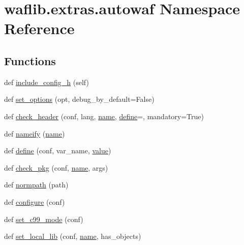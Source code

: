 \hypertarget{namespacewaflib_1_1extras_1_1autowaf}{}\section{waflib.\+extras.\+autowaf Namespace Reference}
\label{namespacewaflib_1_1extras_1_1autowaf}
\subsection*{Functions}
\begin{DoxyCompactItemize}
\item 
def \hyperlink{namespacewaflib_1_1extras_1_1autowaf_accf5c76eadfa640cc8663773bfa12ed0}{include\+\_\+config\+\_\+h} (self)
\item 
def \hyperlink{namespacewaflib_1_1extras_1_1autowaf_a6017597a772d204bcd79d2f6b81e9458}{set\+\_\+options} (opt, debug\+\_\+by\+\_\+default=False)
\item 
def \hyperlink{namespacewaflib_1_1extras_1_1autowaf_aff6706772a1275799816edddf80257a6}{check\+\_\+header} (conf, lang, \hyperlink{lib_2expat_8h_a1b49b495b59f9e73205b69ad1a2965b0}{name}, \hyperlink{namespacewaflib_1_1extras_1_1autowaf_ad4238d888f4c394c2e928dd8a9f3895e}{define}=\textquotesingle{}\textquotesingle{}, mandatory=True)
\item 
def \hyperlink{namespacewaflib_1_1extras_1_1autowaf_af87422be997d380570a60e1d8651a3c7}{nameify} (\hyperlink{lib_2expat_8h_a1b49b495b59f9e73205b69ad1a2965b0}{name})
\item 
def \hyperlink{namespacewaflib_1_1extras_1_1autowaf_ad4238d888f4c394c2e928dd8a9f3895e}{define} (conf, var\+\_\+name, \hyperlink{lib_2expat_8h_a4a30a13b813682e68c5b689b45c65971}{value})
\item 
def \hyperlink{namespacewaflib_1_1extras_1_1autowaf_ab416df5fd79258864b88fcc05c46eff2}{check\+\_\+pkg} (conf, \hyperlink{lib_2expat_8h_a1b49b495b59f9e73205b69ad1a2965b0}{name}, args)
\item 
def \hyperlink{namespacewaflib_1_1extras_1_1autowaf_a171473c8ebbf382bf01dd0a219bd62ce}{normpath} (path)
\item 
def \hyperlink{namespacewaflib_1_1extras_1_1autowaf_aed9c0237757b6bbcc7a442d726e82c47}{configure} (conf)
\item 
def \hyperlink{namespacewaflib_1_1extras_1_1autowaf_ae7b5a43bf0512c14173807eca0b78ff8}{set\+\_\+c99\+\_\+mode} (conf)
\item 
def \hyperlink{namespacewaflib_1_1extras_1_1autowaf_ae92a96787fdf9a6b51392f8227019aa0}{set\+\_\+local\+\_\+lib} (conf, \hyperlink{lib_2expat_8h_a1b49b495b59f9e73205b69ad1a2965b0}{name}, has\+\_\+objects)

\end{DoxyCompactItemize}

